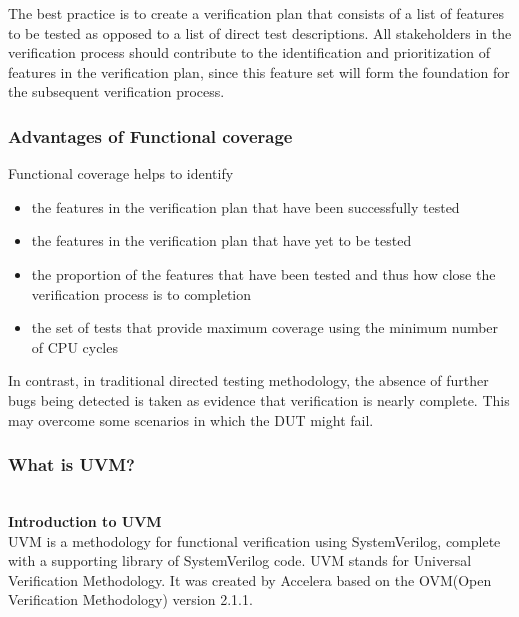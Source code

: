 \documentclass[a4paper,11pt]{article}
\begin{document}
The best practice is to create a verification plan that consists of a list of features to be tested as opposed to a list of direct test descriptions. All stakeholders in the verification process should contribute to the identification and prioritization of features in the verification plan, since this feature set will form the foundation for the subsequent verification process.\cite{doulos}

\subsubsection{Advantages of Functional coverage}
Functional coverage helps to identify

\begin{itemize}[noitemsep]
\item the features in the verification plan that have been successfully tested
\item the features in the verification plan that have yet to be tested
\item the proportion of the features that have been tested and thus how close the verification process is to completion
\item the set of tests that provide maximum coverage using the minimum number of CPU cycles
\end{itemize}

In contrast, in traditional directed testing methodology, the absence of further bugs being detected is taken as evidence that verification is nearly complete. This may overcome some scenarios in which the DUT might fail.\cite{doulos}

\subsubsection{What is UVM?}
\ \\ 
\textbf{Introduction to UVM}
\ \\
UVM is a methodology for functional verification using SystemVerilog, complete with a supporting library of SystemVerilog code. UVM stands for Universal Verification Methodology. It was created by Accelera based on the OVM(Open Verification Methodology) version 2.1.1.
\end{document}
